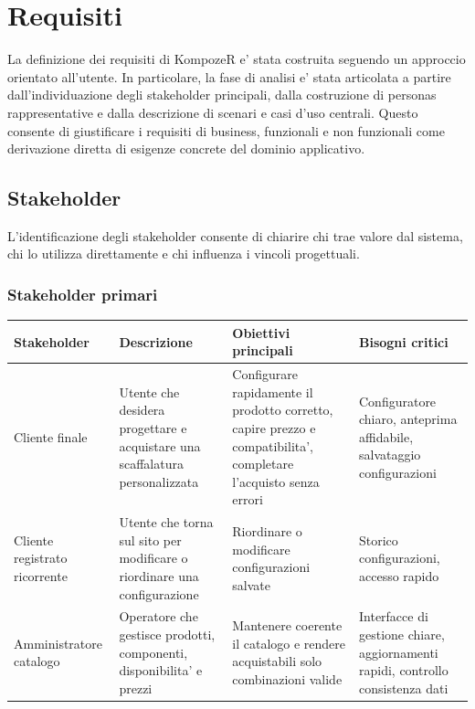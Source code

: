 \section{Requisiti}

La definizione dei requisiti di KompozeR e' stata costruita seguendo un approccio orientato all'utente. 
In particolare, la fase di analisi e' stata articolata a partire dall'individuazione degli stakeholder principali, dalla costruzione di personas rappresentative e dalla descrizione di scenari e casi d'uso centrali. 
Questo consente di giustificare i requisiti di business, funzionali e non funzionali come derivazione diretta di esigenze concrete del dominio applicativo.

\subsection{Stakeholder}

L'identificazione degli stakeholder consente di chiarire chi trae valore dal sistema, chi lo utilizza direttamente e chi influenza i vincoli progettuali.

\subsubsection{Stakeholder primari}

{\footnotesize
\renewcommand{\arraystretch}{1.2}
\begin{center}
\begin{tabular}{|p{2.2cm}|p{2.4cm}|p{2.7cm}|p{2.5cm}|}
\hline
\textbf{Stakeholder} & \textbf{Descrizione} & \textbf{Obiettivi principali} & \textbf{Bisogni critici} \\
\hline
Cliente finale & Utente che desidera progettare e acquistare una scaffalatura personalizzata & Configurare rapidamente il prodotto corretto, capire prezzo e compatibilita', completare l'acquisto senza errori & Configuratore chiaro, anteprima affidabile, salvataggio configurazioni \\
\hline
Cliente registrato ricorrente & Utente che torna sul sito per modificare o riordinare una configurazione & Riordinare o modificare configurazioni salvate & Storico configurazioni, accesso rapido \\
\hline
Amministratore catalogo & Operatore che gestisce prodotti, componenti, disponibilita' e prezzi & Mantenere coerente il catalogo e rendere acquistabili solo combinazioni valide & Interfacce di gestione chiare, aggiornamenti rapidi, controllo consistenza dati \\
\hline
\end{tabular}
\end{center}
}

